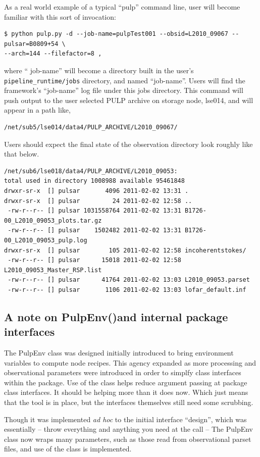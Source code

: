 \documentclass[a4paper,10pt,bibtotoc]{scrartcl}
\begin{document}
As a real world example of a typical ``pulp'' command line, user will
become familiar with this sort of invocation:

\begin{verbatim}
$ python pulp.py -d --job-name=pulpTest001 --obsid=L2010_09067 --pulsar=B0809+54 \
--arch=144 --filefactor=8 ,
\end{verbatim}
where `` job-name'' will become a directory built in the user's
\verb|pipeline_runtime/jobs| directory, and named ``job-name''.  Users
will find the framework's ``job-name'' log file under this jobs
directory.  This command will push output to the user selected PULP
archive on storage node, lse014, and will appear in a path like,

\begin{verbatim}
/net/sub5/lse014/data4/PULP_ARCHIVE/L2010_09067/
\end{verbatim}
Users should expect the final state of the observation directory look
roughly like that below. 
\begin{verbatim}
/net/sub6/lse018/data4/PULP_ARCHIVE/L2010_09053:
total used in directory 1008988 available 95461848
drwxr-sr-x  [] pulsar       4096 2011-02-02 13:31 .
drwxr-sr-x  [] pulsar         24 2011-02-02 12:58 ..
 -rw-r--r-- [] pulsar 1031558764 2011-02-02 13:31 B1726-00_L2010_09053_plots.tar.gz
 -rw-r--r-- [] pulsar    1502482 2011-02-02 13:31 B1726-00_L2010_09053_pulp.log
drwxr-sr-x  [] pulsar        105 2011-02-02 12:58 incoherentstokes/
 -rw-r--r-- [] pulsar      15018 2011-02-02 12:58 L2010_09053_Master_RSP.list
 -rw-r--r-- [] pulsar      41764 2011-02-02 13:03 L2010_09053.parset
 -rw-r--r-- [] pulsar       1106 2011-02-02 13:03 lofar_default.inf
\end{verbatim}


\subsection{A note on PulpEnv()and internal package interfaces}
The PulpEnv class was designed initially introduced to bring environment variables
to compute node recipes.  This agency expanded as more processing and observational
parameters were introduced in order to simplfy class interfaces within the package.
Use of the class helps reduce argument passing at package class interfaces.  It should be helping more than it does now. Which just means that the tool is in place,
but the interfaces themselves still need some scrubbing.

Though it was implemented \textit{ad hoc} to the initial interface ``design'', 
which was essentially -- throw everything and anything you need at the call -- 
The PulpEnv class now wraps many parameters, such as those read from 
observational parset files, and use of the class is implemented.
\end{document}
